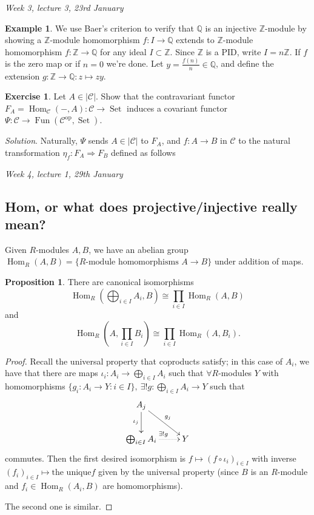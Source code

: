 \documentclass{article}
\newcommand{\Z}{\mathbb{Z}}
\newcommand{\Q}{\mathbb{Q}}
\newcommand{\Fun}{\operatorname{Fun}}
\newcommand{\Hom}{\operatorname{Hom}}
\newcommand{\op}{{\operatorname{op}}}
\newcommand{\Set}{\operatorname{Set}}
\newcommand{\ca}{\mathcal{C}}
\theoremstyle{definition}
\newtheorem{prop}[defn]{Proposition}
\newtheorem{example}[defn]{Example}
\newtheorem{exe}[defn]{Exercise}
\begin{document}
\begin{flushright}
\textit{Week 3, lecture 3, 23rd January}
\end{flushright}

\begin{example}
We use Baer's criterion to verify that $\Q$ is an injective $\Z$-module by showing a $\Z$-module homomorphism $f:I\rightarrow\Q$ extends to $\Z$-module homomorphism $f:\Z\rightarrow\Q$ for any ideal $I\subset\Z$. Since $\Z$ is a PID, write $I=n\Z$. If $f$ is the zero map or if $n=0$ we're done. Let $y=\frac{f(n)}{n}\in\Q$, and define the extension $g:\Z\rightarrow\Q:z\mapsto zy$.
\end{example}

\begin{exe}
Let $A\in|\ca|$. Show that the contravariant functor $F_A=\Hom_\ca(-,A):\ca\rightarrow\Set$ induces a covariant functor $\Psi:\ca\rightarrow\Fun(\ca^\op,\Set)$.

\textit{Solution}. Naturally, $\Psi$ sends $A\in|\ca|$ to $F_A$, and $f:A\rightarrow B$ in $\ca$ to the natural transformation $\eta_f:F_A\Rightarrow F_B$ defined as follows
\end{exe}

\begin{flushright}
\textit{Week 4, lecture 1, 29th January}
\end{flushright}

\subsection{Hom, or what does projective/injective really mean?}

Given $R$-modules $A,B$, we have an abelian group $\Hom_R(A,B)=\{R\text{-module homomorphisms }A\rightarrow B\}$ under addition of maps.

\begin{prop}
There are canonical isomorphisms
\[
\Hom_R\left(\bigoplus_{i\in I}A_i,B\right)\cong\prod_{i\in I}\Hom_R(A,B)
\]
and
\[
\Hom_R\left(A,\prod_{i\in I}B_i\right)\cong\prod_{i\in I}\Hom_R(A,B_i).
\]
\end{prop}
\begin{proof}
Recall the universal property that coproducts satisfy; in this case of $A_i$, we have that there are maps $\iota_i:A_i\rightarrow\bigoplus_{i\in I}A_i$ such that $\forall R$-modules $Y$ with homomorphisms $\{g_i:A_i\rightarrow Y:i\in I\},\ \exists! g:\bigoplus_{i\in I}A_i\rightarrow Y$ such that
\[
\xymatrix{A_j\ar[rd]^{g_j}\ar[d]_{\iota_j}\\ \bigoplus_{i\in I}A_i\ar@{.>}[r]^{\exists! g} & Y}
\]
commutes. Then the first desired isomorphism is $f\mapsto (f\circ\iota_i)_{i\in I}$ with inverse $(f_i)_{i\in I}\mapsto\text{the unique}f$ given by the universal property (since $B$ is an $R$-module and $f_i\in\Hom_R(A_i,B)$ are homomorphisms).

The second one is similar.
\end{proof}
\end{document}
